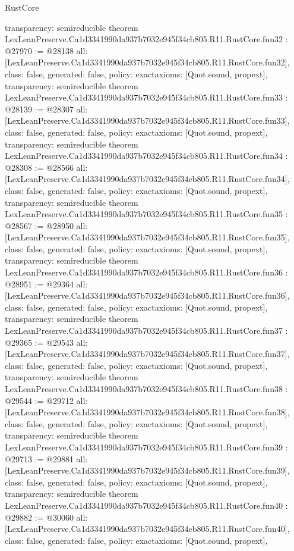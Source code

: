 \begin{lexlean}{RustCore}
\begin{coremodule}
{  transparency: semireducible
}
theorem LexLeanPreserve.Ca1d3341990da937b7032e945f34cb805.R11.RustCore.fun32 : @27970 := @28138 {
  all: [LexLeanPreserve.Ca1d3341990da937b7032e945f34cb805.R11.RustCore.fun32],
  class: false,
  generated: false,
  policy: exact{axioms: [Quot.sound, propext]},
  transparency: semireducible
}
theorem LexLeanPreserve.Ca1d3341990da937b7032e945f34cb805.R11.RustCore.fun33 : @28139 := @28307 {
  all: [LexLeanPreserve.Ca1d3341990da937b7032e945f34cb805.R11.RustCore.fun33],
  class: false,
  generated: false,
  policy: exact{axioms: [Quot.sound, propext]},
  transparency: semireducible
}
theorem LexLeanPreserve.Ca1d3341990da937b7032e945f34cb805.R11.RustCore.fun34 : @28308 := @28566 {
  all: [LexLeanPreserve.Ca1d3341990da937b7032e945f34cb805.R11.RustCore.fun34],
  class: false,
  generated: false,
  policy: exact{axioms: [Quot.sound, propext]},
  transparency: semireducible
}
theorem LexLeanPreserve.Ca1d3341990da937b7032e945f34cb805.R11.RustCore.fun35 : @28567 := @28950 {
  all: [LexLeanPreserve.Ca1d3341990da937b7032e945f34cb805.R11.RustCore.fun35],
  class: false,
  generated: false,
  policy: exact{axioms: [Quot.sound, propext]},
  transparency: semireducible
}
theorem LexLeanPreserve.Ca1d3341990da937b7032e945f34cb805.R11.RustCore.fun36 : @28951 := @29364 {
  all: [LexLeanPreserve.Ca1d3341990da937b7032e945f34cb805.R11.RustCore.fun36],
  class: false,
  generated: false,
  policy: exact{axioms: [Quot.sound, propext]},
  transparency: semireducible
}
theorem LexLeanPreserve.Ca1d3341990da937b7032e945f34cb805.R11.RustCore.fun37 : @29365 := @29543 {
  all: [LexLeanPreserve.Ca1d3341990da937b7032e945f34cb805.R11.RustCore.fun37],
  class: false,
  generated: false,
  policy: exact{axioms: [Quot.sound, propext]},
  transparency: semireducible
}
theorem LexLeanPreserve.Ca1d3341990da937b7032e945f34cb805.R11.RustCore.fun38 : @29544 := @29712 {
  all: [LexLeanPreserve.Ca1d3341990da937b7032e945f34cb805.R11.RustCore.fun38],
  class: false,
  generated: false,
  policy: exact{axioms: [Quot.sound, propext]},
  transparency: semireducible
}
theorem LexLeanPreserve.Ca1d3341990da937b7032e945f34cb805.R11.RustCore.fun39 : @29713 := @29881 {
  all: [LexLeanPreserve.Ca1d3341990da937b7032e945f34cb805.R11.RustCore.fun39],
  class: false,
  generated: false,
  policy: exact{axioms: [Quot.sound, propext]},
  transparency: semireducible
}
theorem LexLeanPreserve.Ca1d3341990da937b7032e945f34cb805.R11.RustCore.fun40 : @29882 := @30060 {
  all: [LexLeanPreserve.Ca1d3341990da937b7032e945f34cb805.R11.RustCore.fun40],
  class: false,
  generated: false,
  policy: exact{axioms: [Quot.sound, propext]},
}
\end{coremodule}
\end{lexlean}
